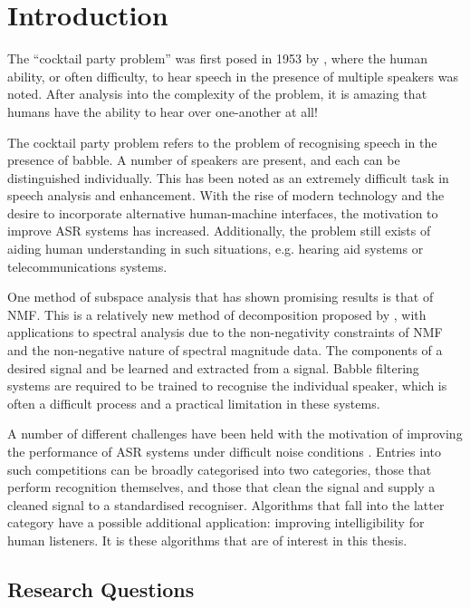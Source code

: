 
\chapter{Introduction}

\acresetall

The ``cocktail party problem'' was first posed in 1953 by \cite{Cherry1953},
where the human ability, or often difficulty, to hear speech in the
presence of multiple speakers was noted. After analysis into the complexity
of the problem, it is amazing that humans have the ability to hear
over one-another at all!

The cocktail party problem refers to the problem of recognising speech
in the presence of babble. A number of speakers are present, and each
can be distinguished individually. This has been noted as an extremely
difficult task in speech analysis and enhancement. With the rise of
modern technology and the desire to incorporate alternative human-machine
interfaces, the motivation to improve \ac{ASR} systems has increased.
Additionally, the problem still exists of aiding human understanding
in such situations, e.g. hearing aid systems or telecommunications
systems.

One method of subspace analysis that has shown promising results is
that of \ac{NMF}. This is a relatively new method of decomposition
proposed by \cite{Lee1999}, with applications to spectral analysis
due to the non-negativity constraints of \ac{NMF} and the non-negative
nature of spectral magnitude data. The components of a desired signal
and be learned and extracted from a signal. Babble filtering systems
are required to be trained to recognise the individual speaker, which
is often a difficult process and a practical limitation in these systems.

A number of different challenges have been held with the motivation
of improving the performance of \ac{ASR} systems under difficult
noise conditions \cite{Cooke2010,Barker2013,Vincent2013}. Entries
into such competitions can be broadly categorised into two categories,
those that perform recognition themselves, and those that clean the
signal and supply a cleaned signal to a standardised recogniser. Algorithms
that fall into the latter category have a possible additional application:
improving intelligibility for human listeners. It is these algorithms
that are of interest in this thesis.


\section{Research Questions}

